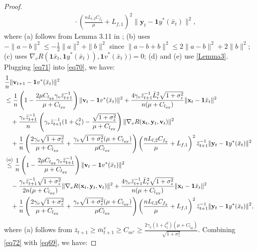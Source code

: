 \documentclass{article}
\theoremstyle{plain}
\theoremstyle{definition}
\theoremstyle{remark}
\begin{document}
\begin{proof}
\begin{align}
&\quad \cdot\left(\frac{nL_{l,2}C_{f_y}}{\mu}+L_{f,1}\right)^2\|\mathbf{y}_t - \mathbf{1}y^*(\bar{x}_t)\|^2,\label{eq71}
\end{align}
where (a) follows from Lemma 3.11 in \citep{bubeck2015convex}; (b) uses $-\|a - b\|^2 \leq -\frac{1}{2}\|a\|^2 + \|b\|^2$ since $\|a - b + b\|^2 \leq 2\|a - b\|^2 + 2\|b\|^2$; (c) uses $\nabla_v R(\mathbf{1}\bar{x}_t, \mathbf{1}y^*(\bar{x}_t)), \mathbf{1}v^*(\bar{x}_t))= 0$; (d) and (e) use \cref{Lemma3}. Plugging \cref{eq71} into \cref{eq70}, we have:
\begin{align}
&\frac{1}{n}\|\mathbf{v}_{t+1} - \mathbf{1}v^*(\bar{x}_{t})\|^2 \nonumber\\
&\leq \frac{1}{n}\left( 1 -  \frac{2\mu C_{l_{yy}}\gamma_v\bar{z}_{t+1}^{-1}}{\mu + C_{l_{yy}}} \right) \|\mathbf{v}_t - \mathbf{1}v^*(\bar{x}_t)\|^2 +\frac{4\gamma_v\bar{z}_{t+1}^{-1}\bar{L}_r^2\sqrt{1+\sigma_z^2}}{n(\mu + C_{l_{yy}})}\|\mathbf{x}_t-\mathbf{1}\bar{x}_t\|^2\nonumber \\
&\quad + \frac{\gamma_v\bar{z}_{t+1}^{-1}}{n}\left(\gamma_v\bar{z}_{t+1}^{-1}(1+\zeta_z^2)-\frac{\sqrt{1+\sigma_z^2}}{\mu+C_{l_{yy}}}\right)\|\nabla_v R(\mathbf{x}_t, \mathbf{y}_t, \mathbf{v}_t)\|^2
 \nonumber \\
&\quad + \frac{1}{n}\left(\frac{2\gamma_v\sqrt{1+\sigma_z^2}}{\mu + C_{l_{yy}}}+\frac{\gamma_v\sqrt{1+\sigma_z^2}(\mu + C_{l_{yy}})}{\mu C_{l_{yy}}} \right)\left(\frac{nL_{l,2}C_{f_y}}{\mu}+L_{f,1}\right)^2\bar{z}_{t+1}^{-1}\|\mathbf{y}_t - \mathbf{1}y^*(\bar{x}_t)\|^2\nonumber \\
&\overset{(a)}{\leq} \frac{1}{n}\left( 1 -  \frac{2\mu C_{l_{yy}}\gamma_v\bar{z}_{t+1}^{-1}}{\mu + C_{l_{yy}}} \right) \|\mathbf{v}_t - \mathbf{1}v^*(\bar{x}_t)\|^2 \notag\\
&\quad- \frac{\gamma_v\bar{z}_{t+1}^{-1}\sqrt{1+\sigma_z^2}}{2n(\mu + C_{l_{yy}}) } \|\nabla_v R(\mathbf{x}_t, \mathbf{y}_t, \mathbf{v}_t)\|^2+\frac{4\gamma_v\bar{z}_{t+1}^{-1}\bar{L}_r^2\sqrt{1+\sigma_z^2}}{n(\mu + C_{l_{yy}})}\|\mathbf{x}_t-\mathbf{1}\bar{x}_t\|^2 \nonumber \\
&\quad + \frac{1}{n}\left(\frac{2\gamma_v\sqrt{1+\sigma_z^2}}{\mu + C_{l_{yy}}}+\frac{\gamma_v\sqrt{1+\sigma_z^2}(\mu + C_{l_{yy}})}{\mu C_{l_{yy}}} \right)\left(\frac{nL_{l,2}C_{f_y}}{\mu}+L_{f,1}\right)^2\bar{z}_{t+1}^{-1}\|\mathbf{y}_t - \mathbf{1}y^*(\bar{x}_t)\|^2,\label{eq72}
\end{align}
where (a) follows from $\bar{z}_{t+1} \geq \bar{m}^v_{t+1} \geq C_{m^v} \geq \frac{2\gamma_v(1+\zeta_z^2)(\mu + C_{l_{yy}})}{\sqrt{1+\sigma_z^2}}$. Combining \cref{eq72} with \cref{eq69}, we have:

\end{proof}
\end{document}
